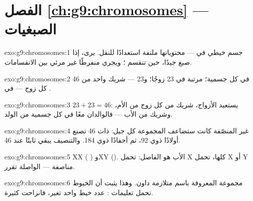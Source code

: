 \section*{الفصل \ref{ch:g9:chromosomes} --- الصبغيات}

\begin{solution}{exo:g9:chromosomes:1}
جسم خيطي في  --- محتوياتها ملتفة استعدادًا للنقل.
يرى، إذا صبغ جيدًا، حين تنقسم ؛ ويجري منفرطًا غير
مرئي بين الانقسامات.
\end{solution}

\begin{solution}{exo:g9:chromosomes:2}
46 في كل  جسمية؛ مرتبة في 23 زوجًا؛ و23 --- شريك
واحد من كل زوج --- في .
\end{solution}

\begin{solution}{exo:g9:chromosomes:3}
$23 + 23 = 46$:  يستعيد الأزواج، شريك من كل زوج
من الأم، وشريك من الأب --- فالوالدان معًا في كل 
جسمية من  الولد.
\end{solution}

\begin{solution}{exo:g9:chromosomes:4}
 غير المنصّفة كانت ستضاعف المجموعة كل جيل: 
ذات 46 تصنع أولادًا ذوي 92، ثم أحفادًا ذوي 184. والتنصيف
يبقي  ثابتًا عند 46.
\end{solution}

\begin{solution}{exo:g9:chromosomes:5}
XX ( ) وXY ().  الأب هو
الفاصل:  تحمل X كلها،  تحمل X أو Y
مناصفة ---  الواصلة تقرر.
\end{solution}

\begin{solution}{exo:g9:chromosomes:6}
مجموعة  المعروفة باسم متلازمة داون. وهذا يثبت أن
الخيوط تحمل تعليمات : عدد خيط واحد تغير، فانزاحت
 كثيرة.
\end{solution}

